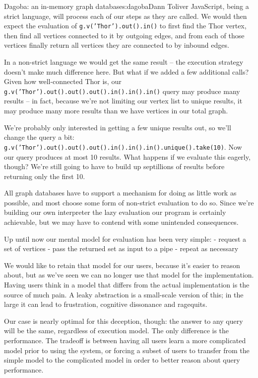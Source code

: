 \begin{aosachapter}{Dagoba: an in-memory graph database}{s:dagoba}{Dann Toliver}
JavaScript, being a strict language, will process each of our steps as
they are called. We would then expect the evaluation of
\texttt{g.v('Thor').out().in()} to first find the Thor vertex, then find
all vertices connected to it by outgoing edges, and from each of those
vertices finally return all vertices they are connected to by inbound
edges.

In a non-strict language we would get the same result -- the execution
strategy doesn't make much difference here. But what if we added a few
additional calls? Given how well-connected Thor is, our
\texttt{g.v('Thor').out().out().out().in().in().in()} query may produce
many results -- in fact, because we're not limiting our vertex list to
unique results, it may produce many more results than we have vertices
in our total graph.

We're probably only interested in getting a few unique results out, so
we'll change the query a bit:
\texttt{g.v('Thor').out().out().out().in().in().in().unique().take(10)}.
Now our query produces at most 10 results. What happens if we evaluate
this eagerly, though? We're still going to have to build up septillions
of results before returning only the first 10.

All graph databases have to support a mechanism for doing as little work
as possible, and most choose some form of non-strict evaluation to do
so. Since we're building our own interpreter the lazy evaluation our
program is certainly achievable, but we may have to contend with some
unintended consequences.

\label{ramifications-of-evaluation-strategy-on-our-mental-model}

Up until now our mental model for evaluation has been very simple: -
request a set of vertices - pass the returned set as input to a pipe -
repeat as necessary

We would like to retain that model for our users, because it's easier to
reason about, but as we've seen we can no longer use that model for the
implementation. Having users think in a model that differs from the
actual implementation is the source of much pain. A leaky abstraction is
a small-scale version of this; in the large it can lead to frustration,
cognitive dissonance and ragequits.

Our case is nearly optimal for this deception, though: the answer to any
query will be the same, regardless of execution model. The only
difference is the performance. The tradeoff is between having all users
learn a more complicated model prior to using the system, or forcing a
subset of users to transfer from the simple model to the complicated
model in order to better reason about query performance.


\end{aosachapter}

